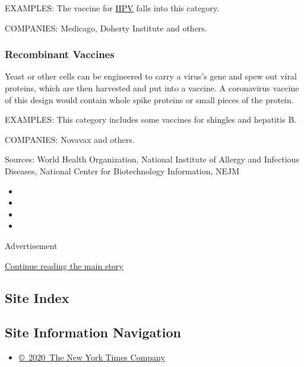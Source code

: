 EXAMPLES: The vaccine for
\href{https://www.nytimes3xbfgragh.onion/2019/06/27/health/hpv-vaccine-warts-cancer.html}{HPV}
falls into this category.

COMPANIES: Medicago, Doherty Institute and others.

\hypertarget{recombinant-vaccines}{%
\subsubsection{\texorpdfstring{\textbf{Recombinant
Vaccines}}{Recombinant Vaccines}}\label{recombinant-vaccines}}

Yeast or other cells can be engineered to carry a virus's gene and spew
out viral proteins, which are then harvested and put into a vaccine. A
coronavirus vaccine of this design would contain whole spike proteins or
small pieces of the protein.

EXAMPLES: This category includes some vaccines for shingles and
hepatitis B.

COMPANIES: Novavax and others.

Sources: World Health Organization, National Institute of Allergy and
Infectious Diseases, National Center for Biotechnology Information, NEJM

\begin{itemize}
\item
\item
\item
\item
\end{itemize}

Advertisement

\protect\hyperlink{after-bottom}{Continue reading the main story}

\hypertarget{site-index}{%
\subsection{Site Index}\label{site-index}}

\hypertarget{site-information-navigation}{%
\subsection{Site Information
Navigation}\label{site-information-navigation}}

\begin{itemize}
\tightlist
\item
  \href{https://help.nytimes3xbfgragh.onion/hc/en-us/articles/115014792127-Copyright-notice}{©~2020~The
  New York Times Company}
\end{itemize}

